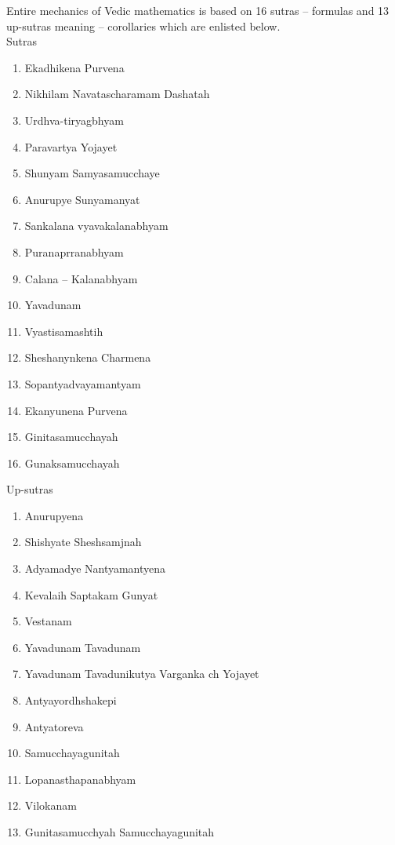 Entire mechanics of Vedic mathematics is based on 16 sutras – formulas and 13 up-sutras meaning – corollaries which are enlisted below.\\
Sutras
\begin{enumerate}
  \item Ekadhikena Purvena
  \item Nikhilam Navatascharamam Dashatah
  \item Urdhva-tiryagbhyam
  \item Paravartya Yojayet
  \item Shunyam Samyasamucchaye
  \item Anurupye Sunyamanyat
  \item Sankalana vyavakalanabhyam
  \item Puranaprranabhyam
  \item Calana – Kalanabhyam
  \item Yavadunam
  \item Vyastisamashtih
  \item Sheshanynkena Charmena
  \item Sopantyadvayamantyam
  \item Ekanyunena Purvena
  \item Ginitasamucchayah
  \item Gunaksamucchayah
\end{enumerate}

Up-sutras
\begin{enumerate}
  \item Anurupyena
  \item Shishyate Sheshsamjnah
  \item Adyamadye Nantyamantyena
  \item Kevalaih Saptakam Gunyat
  \item Vestanam
  \item Yavadunam Tavadunam
  \item Yavadunam Tavadunikutya Varganka ch Yojayet
  \item Antyayordhshakepi
  \item Antyatoreva
  \item Samucchayagunitah
  \item Lopanasthapanabhyam
  \item Vilokanam
  \item Gunitasamucchyah Samucchayagunitah
\end{enumerate}

